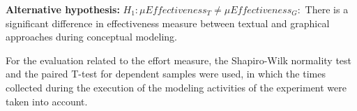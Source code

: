 \documentclass[a4paper,twoside,anonymous]{article}
\begin{document}
\textbf{Alternative hypothesis:} $H_{1} : \mu Effectiveness_T \neq \mu  Effectiveness_G :$ There is a significant difference in effectiveness measure between textual and graphical approaches during conceptual modeling. %

For the evaluation related to the effort measure, the Shapiro-Wilk normality test 
and the paired T-test for dependent samples 
were used, in which the times collected during the execution of the modeling activities of the experiment were taken into account.




\end{document}
